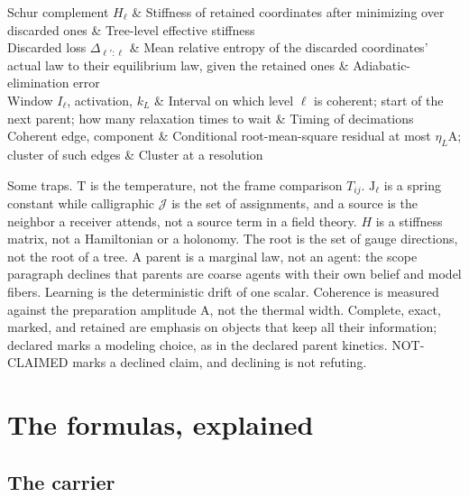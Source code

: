 \begin{decoder}
Schur complement \(H_\ell\) & Stiffness of retained coordinates after minimizing over discarded ones & Tree-level effective stiffness \\
Discarded loss \(\Delta_{\ell':\ell}\) & Mean relative entropy of the discarded coordinates' actual law to their equilibrium law, given the retained ones & Adiabatic-elimination error \\
Window \(I_\ell\), activation, \(k_L\) & Interval on which level \(\ell\) is coherent; start of the next parent; how many relaxation times to wait & Timing of decimations \\
Coherent edge, component & Conditional root-mean-square residual at most \(\eta_L\mathrm A\); cluster of such edges & Cluster at a resolution \\
\end{decoder}

Some traps. \(\mathrm T\) is the temperature, not the frame comparison \(T_{ij}\). \(\mathrm J_\ell\) is a spring
constant while calligraphic \(\mathcal J\) is the set of assignments, and a source is the neighbor a
receiver attends, not a source term in a field theory. \(H\) is a stiffness matrix, not a Hamiltonian or a
holonomy. The root is the set of gauge directions, not the root of a tree. A parent is a marginal law,
not an agent: the scope paragraph declines that parents are coarse agents with their own belief and model
fibers. Learning is the deterministic drift of one scalar. Coherence is measured against the preparation
amplitude \(\mathrm A\), not the thermal width. Complete, exact, marked, and retained are emphasis on
objects that keep all their information; declared marks a modeling choice, as in the declared parent
kinetics. NOT-CLAIMED marks a declined claim, and declining is not refuting.

\section{The formulas, explained}
\label{comp:ch13-formulas}

\subsection{The carrier}
\label{comp:ch13-carrier}

